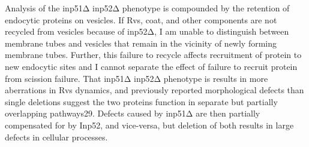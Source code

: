 	\vspace{5mm}
Analysis of the inp51Δ inp52Δ phenotype is compounded by the retention of endocytic proteins on vesicles. If Rvs, coat, and other components are not recycled from vesicles because of inp52Δ, I am unable to distinguish between membrane tubes and vesicles that remain in the vicinity of newly forming membrane tubes. Further, this failure to recycle affects recruitment of protein to new endocytic sites and I cannot separate the effect of failure to recruit protein from scission failure. That inp51Δ inp52Δ phenotype is results in more aberrations in Rvs dynamics, and previously reported morphological defects than single deletions suggest the two proteins function in separate but partially overlapping pathways29. Defects caused by inp51Δ are then partially compensated for by Inp52, and vice-versa, but deletion of both results in large defects in cellular processes.


